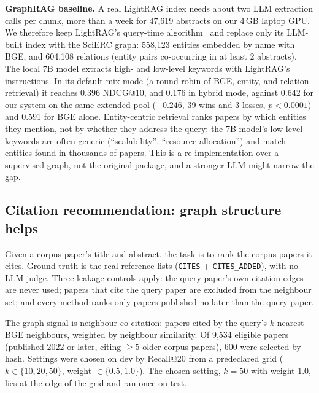 \documentclass[conference]{IEEEtran}
\begin{document}
\textbf{GraphRAG baseline.} A real LightRAG index needs about two LLM extraction calls per chunk, more than a week for 47,619 abstracts on our 4\,GB laptop GPU. We therefore keep LightRAG's query-time algorithm~\cite{guo2025lightrag} and replace only its LLM-built index with the SciERC graph: 558,123 entities embedded by name with BGE, and 604,108 relations (entity pairs co-occurring in at least 2 abstracts). The local 7B model extracts high- and low-level keywords with LightRAG's instructions. In its default mix mode (a round-robin of BGE, entity, and relation retrieval) it reaches 0.396 NDCG@10, and 0.176 in hybrid mode, against 0.642 for our system on the same extended pool ($+0.246$, 39 wins and 3 losses, $p < 0.0001$) and 0.591 for BGE alone. Entity-centric retrieval ranks papers by which entities they mention, not by whether they address the query: the 7B model's low-level keywords are often generic (``scalability'', ``resource allocation'') and match entities found in thousands of papers. This is a re-implementation over a supervised graph, not the original package, and a stronger LLM might narrow the gap.

\subsection{Citation recommendation: graph structure helps}
\label{sec:citrec}

Given a corpus paper's title and abstract, the task is to rank the corpus papers it cites. Ground truth is the real reference lists (\texttt{CITES} + \texttt{CITES\_ADDED}), with no LLM judge. Three leakage controls apply: the query paper's own citation edges are never used; papers that cite the query paper are excluded from the neighbour set; and every method ranks only papers published no later than the query paper.

The graph signal is neighbour co-citation: papers cited by the query's $k$ nearest BGE neighbours, weighted by neighbour similarity. Of 9,534 eligible papers (published 2022 or later, citing $\geq 5$ older corpus papers), 600 were selected by hash. Settings were chosen on dev by Recall@20 from a predeclared grid ($k \in \{10, 20, 50\}$, weight $\in \{0.5, 1.0\}$). The chosen setting, $k = 50$ with weight 1.0, lies at the edge of the grid and ran once on test.

\begin{table}[t]
\centering
\caption{Citation recommendation, 400 test papers}
\label{tab:citrec}
\end{table}
\end{document}
